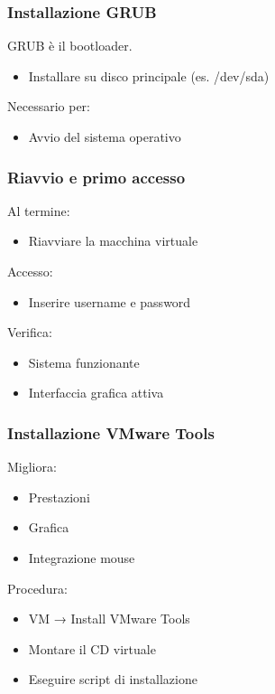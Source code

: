 \documentclass{beamer}
\begin{document}
	
	\begin{frame}
		\frametitle{Installazione GRUB}
		
		GRUB è il bootloader.
		
		\begin{itemize}
			\item Installare su disco principale (es. /dev/sda)
		\end{itemize}
		
		Necessario per:
		\begin{itemize}
			\item Avvio del sistema operativo
		\end{itemize}
		
	\end{frame}
	
	
	\begin{frame}
		\frametitle{Riavvio e primo accesso}
		
		Al termine:
		\begin{itemize}
			\item Riavviare la macchina virtuale
		\end{itemize}
		
		Accesso:
		\begin{itemize}
			\item Inserire username e password
		\end{itemize}
		
		Verifica:
		\begin{itemize}
			\item Sistema funzionante
			\item Interfaccia grafica attiva
		\end{itemize}
		
	\end{frame}
	
	
	\begin{frame}
		\frametitle{Installazione VMware Tools}
		
		Migliora:
		\begin{itemize}
			\item Prestazioni
			\item Grafica
			\item Integrazione mouse
		\end{itemize}
		
		Procedura:
		\begin{itemize}
			\item VM → Install VMware Tools
			\item Montare il CD virtuale
			\item Eseguire script di installazione
		\end{itemize}
		
	\end{frame}
	
	
	
\end{document}
